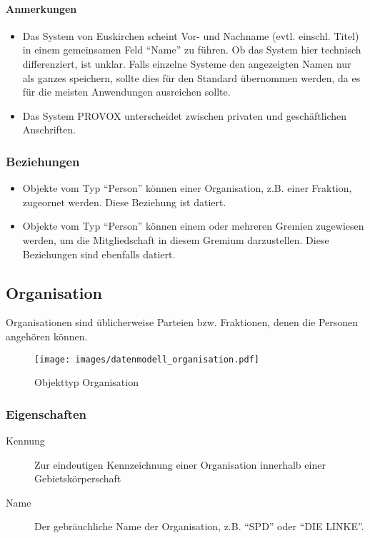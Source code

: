 \documentclass[,a4paper]{article}
\makeatletter
\def\maxwidth{\ifdim\Gin@nat@width>\linewidth\linewidth
\else\Gin@nat@width\fi}
\let\Oldincludegraphics\includegraphics
\renewcommand{\includegraphics}[1]{\Oldincludegraphics[width=\maxwidth]{#1}}
\makeatother
\begin{document}
\paragraph{Anmerkungen}

\begin{itemize}
\item
  Das System von Euskirchen scheint Vor- und Nachname (evtl. einschl.
  Titel) in einem gemeinsamen Feld ``Name'' zu führen. Ob das System
  hier technisch differenziert, ist unklar. Falls einzelne Systeme den
  angezeigten Namen nur als ganzes speichern, sollte dies für den
  Standard übernommen werden, da es für die meisten Anwendungen
  ausreichen sollte.
\item
  Das System PROVOX unterscheidet zwischen privaten und geschäftlichen
  Anschriften.
\end{itemize}

\subsubsection{Beziehungen}

\begin{itemize}
\item
  Objekte vom Typ ``Person'' können einer Organisation, z.B. einer
  Fraktion, zugeornet werden. Diese Beziehung ist datiert.
\item
  Objekte vom Typ ``Person'' können einem oder mehreren Gremien
  zugewiesen werden, um die Mitgliedschaft in diesem Gremium
  darzustellen. Diese Beziehungen sind ebenfalls datiert.
\end{itemize}

\subsection{Organisation}

Organisationen sind üblicherweise Parteien bzw. Fraktionen, denen die
Personen angehören können.

\begin{figure}[htbp]
\centering
\texttt{[image: images/datenmodell\_organisation.pdf]}
\caption{Objekttyp Organisation}
\end{figure}

\subsubsection{Eigenschaften}

\begin{description}
\item[Kennung]
Zur eindeutigen Kennzeichnung einer Organisation innerhalb einer
Gebietskörperschaft
\item[Name]
Der gebräuchliche Name der Organisation, z.B. ``SPD'' oder ``DIE
LINKE''.
\end{description}
\end{document}

